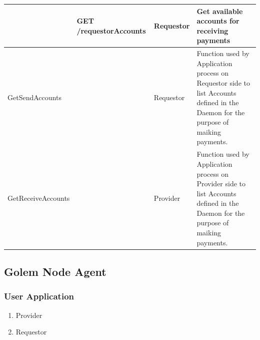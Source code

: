 \begin{enumerate}
\begin{enumerate}
\begin{table}[H]
\begin{center}
\begin{tabular}{|p{3cm}|p{7cm}|p{1.5cm}|p{4cm}|}
						&	GET /requestorAccounts						&	Requestor 	&	Get available accounts for receiving payments \\
\hline

GetSendAccounts			&												&	Requestor 	&	Function used by Application process on Requestor side to
																							list Accounts defined in the Daemon for the purpose of maiking payments. \\
\hline

GetReceiveAccounts		&												&	Provider 	&	Function used by Application process on Provider side to
																							list Accounts defined in the Daemon for the purpose of maiking payments. \\
\hline


\end{tabular}
\end{center}
\end{table}

\end{enumerate}

\end{enumerate}

\subsection{Golem Node Agent}

\subsubsection{User Application}

\begin{enumerate}

\item Provider

\item Requestor

\end{enumerate}

